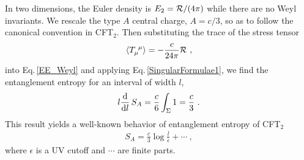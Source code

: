 In two dimensions, the Euler density is $E_2 = {\cal R}/(4\pi)$ while there are no Weyl invariants.
We rescale the type $A$ central charge, $A = c/3$, so as to follow the canonical convention in CFT$_2$.
Then substituting the trace of the stress tensor
\begin{align}
\langle T_\mu^{~\mu} \rangle = - \frac{c}{24\pi}{\cal R} \ ,
\end{align}
into Eq.\,\eqref{EE_Weyl} and applying Eq.\,\eqref{SingularFormulae1}, we find the entanglement entropy for an interval of width $l$,
\begin{align}
l \frac{\mathrm{d}}{\mathrm{d} l}\, S_A = \frac{c}{6}\int_\Sigma 1 = \frac{c}{3} \ .
\end{align}
This result yields a well-known behavior of entanglement entropy of CFT$_2$ \cite{Holzhey:1994we,jin2004quantum,Calabrese:2004eu}
\begin{align}\label{EE_CFT2}
S_A = \frac{c}{3}\log \frac{l}{\epsilon} + \cdots \ ,
\end{align}
where $\epsilon$ is a UV cutoff and $\cdots$ are finite parts.

